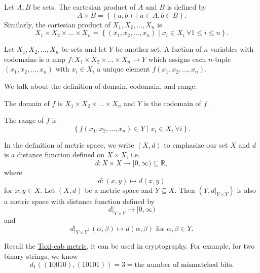 \begin{definition}\label{dfn:Cartesian Product}
    Let \(A, B\) be sets. The cartesian product of \(A\) and \(B\) is defined by 
    \[
        A \times B = \left\{ (a, b) \mid a \in A, b \in B \right\}. 
    \]   
    Similarly, the cartesian product of \(X_1, X_2, \dots , X_n\) is 
    \[
        X_1 \times X_2 \times \dots \times X_n = \left\{ (x_1, x_2, \dots , x_n) \mid x_i \in X_i \ \forall 1 \le i \le n\right\}. 
    \] 
\end{definition}

\begin{definition}[Functions] \label{def: functions}
    Let \(X_1, X_2, \dots , X_n\) be sets and let \(Y\) be another set. A fuction of \(n\) variables with codomains is a map \(f: X_1 \times X_2 \times \dots \times X_n \to Y\) which assigns each \(n\)-tuple \((x_1, x_2, \dots , x_n)\) with \(x_i \in X_i\) a unique element \(f(x_1, x_2, \dots , x_n)\).       
\end{definition}

\begin{definition*}
    We talk about the definition of domain, codomain, and range:
    \begin{definition}
        The domain of \(f\) is \(X_1 \times X_2 \times \dots \times X_n\) and \(Y\) is the codomain of \(f\).   
    \end{definition}
    \begin{definition}
        The range of \(f\) is 
        \[
            \left\{ f(x_1, x_2, \dots ,x_n) \in Y \mid x_i \in X_i \ \forall i \right\}.
        \] 
    \end{definition}
\end{definition*}

In the definition of metric space, we write \((X, d)\) to emphasize our set \(X\) and \(d\) is a distance function defined on \(X \times X\), i.e. 
\[
    d: X \times X \to [0, \infty) \subseteq \mathbb{R},
\]    where 
\[
    d: (x,y) \mapsto d(x,y)
\]
for \(x, y \in X\). Let \((X, d)\) be a metric space and \(Y \subseteq X\). Then \((Y, d \vert _{Y \times Y})\) is also a metric space with distance function defined by 
\[
    d \vert _{Y \times Y} \to [0, \infty)
\]    and 
\[
    d \vert _{Y \times Y}: (\alpha , \beta) \mapsto d(\alpha , \beta ) \text{ for } \alpha , \beta \in Y.
\]

\begin{eg}
    Recall the \hyperref[def: l1-metric]{Taxi-cab metric}, it can be used in cryptography. For example, for two binary strings, we know 
    \[
        d_1((10010), (10101)) = 3 = \text{the number of mismatched bits}.
    \]
\end{eg}

